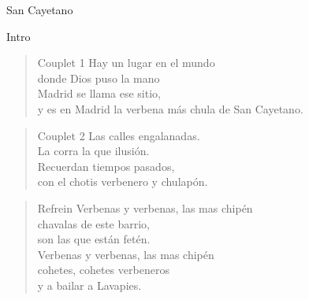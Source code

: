 \begin{song}{San Cayetano}
\begin{instrumental}{Intro}
   \measure{}
   \measure{}
   \hspace{3em} \measure{}
   
\end{instrumental}

\begin{verse}{Couplet 1}
Hay un lugar en el mundo\\
donde Dios puso la mano\\
\chord{}Madrid se llama ese sitio,\\
y es en Madrid la verbena m\'{a}s chula de San Cayetano.\\
\end{verse}

\begin{verse}{Couplet 2}
Las calles engalanadas.\\
La corra la que ilusi\'{o}n.\\
Recuerdan tiempos pasados,\\
con el chotis verbenero y chulap\'{o}n.\hspace{1.75em}\\
\end{verse}

\begin{verse}{Refrein}
Verbenas y verbenas, las mas chip\'{e}n\\
\chord{}chavalas de este barrio,\\
son las que est\'{a}n fet\'{e}n.\\
Verbenas y verbenas, las mas chip\'{e}n\\
cohetes, cohetes verbeneros\\
y a bailar a Lavapies.\hspace{1.75em}\\
\end{verse}

\end{song}

